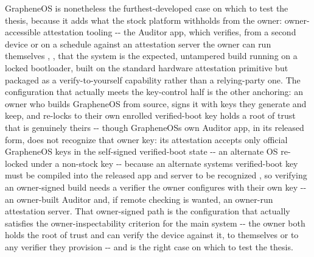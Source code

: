 \documentclass[
]{article}
\begin{document}
GrapheneOS is nonetheless the furthest-developed case on which to test
the thesis, because it adds what the stock platform withholds from the
owner: owner-accessible attestation tooling -\/- the Auditor app, which
verifies, from a second device or on a schedule against an attestation
server the owner can run themselves \citep{grapheneos-auditor},
\citep{grapheneos-attestation-server}, that the system is the expected,
untampered build running on a locked bootloader, built on the standard
hardware attestation primitive but packaged as a verify-to-yourself
capability rather than a relying-party one. The configuration that
actually meets the key-control half is the other anchoring: an owner who
builds GrapheneOS from source, signs it with keys they generate and
keep, and re-locks to their own enrolled verified-boot key holds a root
of trust that is genuinely theirs \citep{grapheneos-build} -\/- though
GrapheneOS\textquotesingle s own Auditor app, in its released form, does
not recognize that owner key: its attestation accepts only official
GrapheneOS keys in the self-signed verified-boot state -\/- an alternate
OS re-locked under a non-stock key -\/- because an alternate
system\textquotesingle s verified-boot key must be compiled into the
released app and server to be recognized \citep{grapheneos-auditor}, so
verifying an owner-signed build needs a verifier the owner configures
with their own key -\/- an owner-built Auditor and, if remote checking
is wanted, an owner-run attestation server. That owner-signed path is
the configuration that actually satisfies the owner-inspectability
criterion for the main system -\/- the owner both holds the root of
trust and can verify the device against it, to themselves or to any
verifier they provision -\/- and is the right case on which to test the
thesis.
\end{document}
